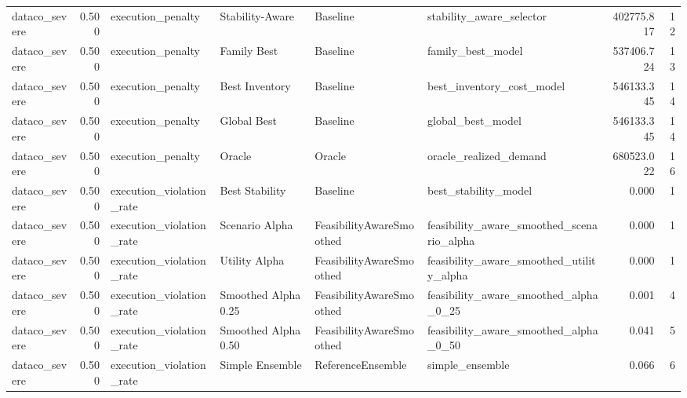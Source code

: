 \begin{table}
{\begin{tabular}{lrllllrr}
 dataco\_severe &             0.500 &           execution\_penalty &       Stability-Aware &                  Baseline &                           stability\_aware\_selector &    402775.817 &              12 \\
 dataco\_severe &             0.500 &           execution\_penalty &           Family Best &                  Baseline &                                  family\_best\_model &    537406.724 &              13 \\
 dataco\_severe &             0.500 &           execution\_penalty &        Best Inventory &                  Baseline &                          best\_inventory\_cost\_model &    546133.345 &              14 \\
 dataco\_severe &             0.500 &           execution\_penalty &           Global Best &                  Baseline &                                  global\_best\_model &    546133.345 &              14 \\
 dataco\_severe &             0.500 &           execution\_penalty &                Oracle &                    Oracle &                             oracle\_realized\_demand &    680523.022 &              16 \\
 dataco\_severe &             0.500 &    execution\_violation\_rate &        Best Stability &                  Baseline &                               best\_stability\_model &         0.000 &               1 \\
 dataco\_severe &             0.500 &    execution\_violation\_rate &        Scenario Alpha &  FeasibilityAwareSmoothed &          feasibility\_aware\_smoothed\_scenario\_alpha &         0.000 &               1 \\
 dataco\_severe &             0.500 &    execution\_violation\_rate &         Utility Alpha &  FeasibilityAwareSmoothed &           feasibility\_aware\_smoothed\_utility\_alpha &         0.000 &               1 \\
 dataco\_severe &             0.500 &    execution\_violation\_rate &   Smoothed Alpha 0.25 &  FeasibilityAwareSmoothed &              feasibility\_aware\_smoothed\_alpha\_0\_25 &         0.001 &               4 \\
 dataco\_severe &             0.500 &    execution\_violation\_rate &   Smoothed Alpha 0.50 &  FeasibilityAwareSmoothed &              feasibility\_aware\_smoothed\_alpha\_0\_50 &         0.041 &               5 \\
 dataco\_severe &             0.500 &    execution\_violation\_rate &       Simple Ensemble &         ReferenceEnsemble &                                    simple\_ensemble &         0.066 &               6 \\

\end{tabular}}
\end{table}
